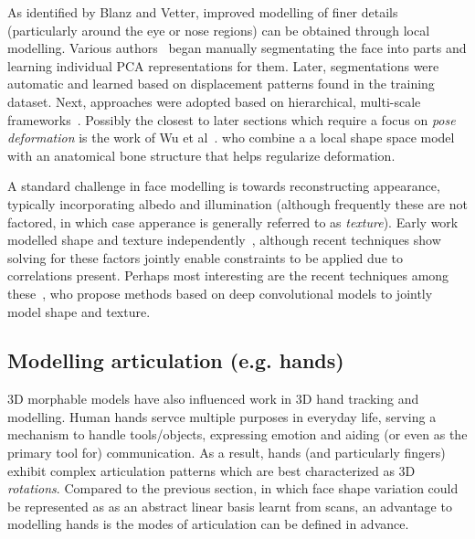 As identified by Blanz and Vetter, improved modelling of finer details (particularly around the eye or nose regions) can be obtained through local modelling. Various authors~\cite{xxx} began manually segmentating the face into parts and learning individual PCA representations for them. Later, segmentations were automatic and learned based on displacement patterns found in the training dataset. Next, approaches were adopted based on hierarchical, multi-scale frameworks~\cite{xxx, xxx}. Possibly the closest to later sections which require a focus on \emph{pose deformation}  is the work of Wu et al~\cite{xxx}. who combine a a local shape space model with an anatomical bone structure that helps regularize deformation. 


A standard challenge in face modelling is towards reconstructing appearance, typically incorporating albedo and illumination (although frequently these are not factored, in which case apperance is generally referred to as \emph{texture}). Early work modelled shape and texture independently~\cite{xxx, xxx}, although recent techniques show solving for these factors jointly enable constraints to be applied due to correlations present. Perhaps most interesting are the recent techniques among these~\cite{xxx, xxx}, who propose methods based on deep convolutional models to jointly model shape and texture.  



\subsection{Modelling articulation (e.g. hands)}




3D morphable models have also influenced work in 3D hand tracking and modelling. Human hands servce multiple purposes in everyday life, serving a mechanism to handle tools/objects, expressing emotion and aiding (or even as the primary tool for) communication. As a result, hands (and particularly fingers) exhibit complex articulation patterns which are best characterized as 3D \emph{rotations}. Compared to the previous section, in which face shape variation could be represented as as an abstract linear basis learnt from scans, an advantage to modelling hands is the modes of articulation can be defined in advance. 

